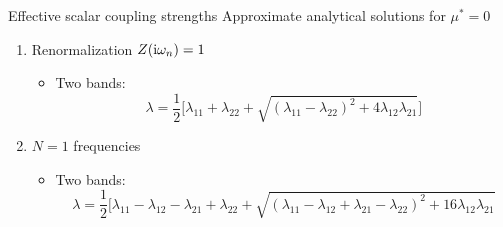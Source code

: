 \documentclass[10pt]{beamer}
\begin{document}
\begin{frame}[label=scalars]{Effective scalar coupling strengths}
        Approximate analytical solutions for $\mu^* = 0$ \vspace{2mm}
        \begin{enumerate}
            \item Renormalization $Z(\mathrm i \omega_n) = 1$
            \begin{center}
            \end{center}
            \begin{itemize}
                \item Two bands:
                \begin{equation*}
                    \lambda
                    = \frac 1 2 \Big[ \lambda_{11} + \lambda_{22} + \sqrt{
                        (\lambda_{1 1} - \lambda_{2 2})^2
                        + 4 \lambda_{1 2} \lambda_{2 1}
                        }
                    \Big]
                \end{equation*}
            \end{itemize}
            \item $N = 1$  frequencies
            \begin{center}
            \end{center}
            \begin{itemize}
                \item Two bands:
                \begin{equation*}
                    \lambda = \frac 1 2 \Big[
                          \lambda_{1 1} - \lambda_{1 2}
                        - \lambda_{2 1} + \lambda_{2 2}
                        + \sqrt{
                            ( \lambda_{1 1} - \lambda_{1 2}
                            + \lambda_{2 1} - \lambda_{2 2} )^2
                            + 16 \lambda_{1 2} \lambda_{2 1}
}
\end{equation*}
\end{itemize}
\end{enumerate}
\end{frame}
\end{document}
